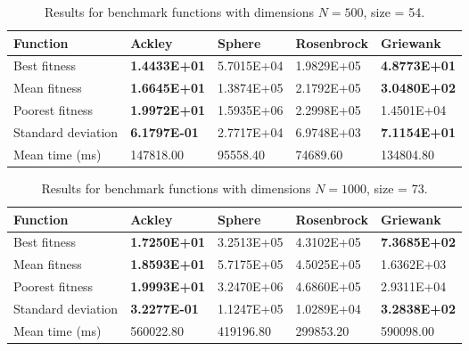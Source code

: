\documentclass[KomodoMain.tex]{subfiles}
\begin{document}
\begin{table}[!htbp]
\small
\caption{ \small Results for benchmark functions with dimensions $N = 500$, size = 54.}
\label{table:X}
\begin{tabular}{ p{3cm} p{2.4cm} p{2.4cm} p{2.4cm} p{2.4cm}}
 \hline
 Function   & Ackley  & Sphere & Rosenbrock & Griewank \\
 \hline
 Best fitness  & \textbf{1.4433E+01} & 5.7015E+04 & 1.9829E+05 & \textbf{4.8773E+01}  \\
 
 Mean fitness & \textbf{1.6645E+01} & 1.3874E+05 & 2.1792E+05 & \textbf{3.0480E+02} \\
 
 Poorest fitness & \textbf{1.9972E+01} & 1.5935E+06 & 2.2998E+05 & 1.4501E+04\\
 
 Standard deviation & \textbf{6.1797E-01} & 2.7717E+04 & 6.9748E+03 & \textbf{7.1154E+01} \\
 
 Mean time (ms) & 147818.00 & 95558.40 & 74689.60 & 134804.80\\
 \hline
\end{tabular}
\end{table}

\begin{table}[!htbp]
\small
\caption{\small Results for benchmark functions with dimensions $N = 1000$, size = 73.}
\label{table:X}
\begin{tabular}{ p{3cm} p{2.4cm} p{2.4cm} p{2.4cm} p{2.4cm}}
 \hline
 Function   & Ackley  & Sphere & Rosenbrock & Griewank \\
 \hline
 Best fitness   & \textbf{1.7250E+01} & 3.2513E+05 & 4.3102E+05 &  \textbf{7.3685E+02} \\
 
 Mean fitness & \textbf{1.8593E+01} & 5.7175E+05 & 4.5025E+05 & 1.6362E+03 \\
 
 Poorest fitness & \textbf{1.9993E+01} & 3.2470E+06 & 4.6860E+05 & 2.9311E+04 \\
 
 Standard deviation & \textbf{3.2277E-01} & 1.1247E+05 & 1.0289E+04 & \textbf{3.2838E+02} \\
 
 Mean time (ms) & 560022.80 & 419196.80 & 299853.20 & 590098.00 \\
 \hline
\end{tabular}
\end{table}
\end{document}
